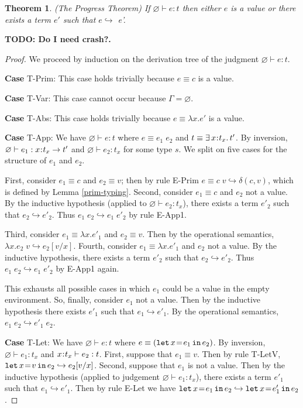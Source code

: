 \documentclass[11pt]{article}
\newtheorem{theorem}{Theorem}%
\newcommand{\bind}{\hspace{0.05em}{:}\hspace{0.05em}} %
\newcommand{\step}{\hookrightarrow}
\newcommand{\existype}[3]{\exists\, #1\bind #2.\, #3}
\newcommand{\functype}[3]{#1\bind #2 \rightarrow #3}
\newcommand{\letin}[3]{{\tt let}\,#1\hspace{0.1em}{=}\hspace{0.1em}#2\,{\tt in}\,#3}
\begin{document}
\begin{theorem}\label{progress}
(The Progress Theorem) If $\varnothing \vdash e : t$ then either $e$ is a value or there exists a term $e'$ such that $e \hookrightarrow$ e'.
\end{theorem} {\bf TODO: Do I need crash?.}

\begin{proof} We proceed by induction on the derivation tree of the judgment $\varnothing \vdash e : t$.

{\bf Case} {\sc T-Prim}: This case holds trivially because $e \equiv c$ is a value.

{\bf Case} {\sc T-Var}: This case cannot occur because $\Gamma = \varnothing$.

{\bf Case} {\sc T-Abs}: This case holds trivially because $e \equiv \lambda x.e'$ is a value.

{\bf Case} {\sc T-App}: We have $\varnothing \vdash e : t$ where $e \equiv e_1\; e_2$ and $t \equiv \existype{x}{t_x}{t'}$. By inversion, $\varnothing \vdash e_1 : \functype{x}{t_x}{t'}$ and $\varnothing \vdash e_2 : t_x$ for some type $s$. We split on five cases for the structure of $e_1$ and $e_2$.

First, consider $e_1 \equiv c$ and $e_2 \equiv v$; then by rule {\sc E-Prim} $e \equiv c\; v \hookrightarrow \delta(c,v)$, which is defined by Lemma \ref{prim-typing}.
Second, consider $e_1 \equiv c$ and $e_2$ not a value. By the inductive hypothesis (applied to $\varnothing \vdash e_2 : t_x$), there exists a term $e'_2$ such that $e_2 \step e'_2$. Thus $e_1\; e_2 \step e_1 \; e'_2$ by rule {\sc E-App1}.

Third, consider $e_1 \equiv \lambda x.e'_1$ and $e_2 \equiv v$. Then by the operational semantics, $\lambda x.e_2 \; v \step e_2[v/x]$. Fourth, consider $e_1 \equiv \lambda x.e'_1$ and $e_2$ not a value. By the inductive hypothesis, there exists a term $e'_2$ such that $e_2 \step e'_2$. Thus $e_1\; e_2 \step e_1 \; e'_2$ by {\sc E-App1} again.

This exhausts all possible cases in which $e_1$ could be a value in the empty environment. So, finally, consider $e_1$ not a value. Then by the inductive hypothesis there exists $e'_1$ such that $e_1 \hookrightarrow e'_1$. By the operational semantics, $e_1\; e_2 \hookrightarrow e'_1\; e_2$.

{\bf Case} {\sc T-Let}: We have $\varnothing \vdash e : t$ where
$e \equiv (\letin{x}{e_1}{e_2})$. By inversion, $\varnothing \vdash e_1:t_x$ and $x\bind t_x\vdash e_2: t$. First, suppose that $e_1 \equiv v$. Then by rule {\sc T-LetV}, $\letin{x}{v}{e_2} \step e_2[v/x]$. Second, suppose that $e_1$ is not a value. Then by the inductive hypothesis (applied to judgement $\varnothing \vdash e_1:t_x$), there exists a term $e'_1$ such that $e_1 \step e'_1$. Then by rule {\sc E-Let} we have $\letin{x}{e_1}{e_2} \step \letin{x}{e'_1}{e_2}$.


\end{proof}
\end{document}
